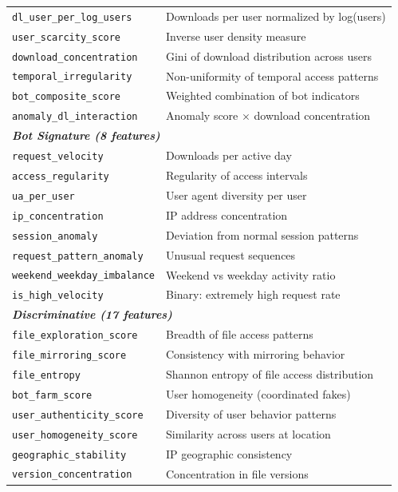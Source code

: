 \documentclass[11pt,a4paper]{article}
\begin{document}
\begin{longtable}{p{5.2cm}p{9.3cm}}
\texttt{dl\_user\_per\_log\_users} & Downloads per user normalized by log(users) \\
\texttt{user\_scarcity\_score} & Inverse user density measure \\
\texttt{download\_concentration} & Gini of download distribution across users \\
\texttt{temporal\_irregularity} & Non-uniformity of temporal access patterns \\
\texttt{bot\_composite\_score} & Weighted combination of bot indicators \\
\texttt{anomaly\_dl\_interaction} & Anomaly score $\times$ download concentration \\
\midrule
\multicolumn{2}{l}{\textit{\textbf{Bot Signature (8 features)}}} \\
\texttt{request\_velocity} & Downloads per active day \\
\texttt{access\_regularity} & Regularity of access intervals \\
\texttt{ua\_per\_user} & User agent diversity per user \\
\texttt{ip\_concentration} & IP address concentration \\
\texttt{session\_anomaly} & Deviation from normal session patterns \\
\texttt{request\_pattern\_anomaly} & Unusual request sequences \\
\texttt{weekend\_weekday\_imbalance} & Weekend vs weekday activity ratio \\
\texttt{is\_high\_velocity} & Binary: extremely high request rate \\
\midrule
\multicolumn{2}{l}{\textit{\textbf{Discriminative (17 features)}}} \\
\texttt{file\_exploration\_score} & Breadth of file access patterns \\
\texttt{file\_mirroring\_score} & Consistency with mirroring behavior \\
\texttt{file\_entropy} & Shannon entropy of file access distribution \\
\texttt{bot\_farm\_score} & User homogeneity (coordinated fakes) \\
\texttt{user\_authenticity\_score} & Diversity of user behavior patterns \\
\texttt{user\_homogeneity\_score} & Similarity across users at location \\
\texttt{geographic\_stability} & IP geographic consistency \\
\texttt{version\_concentration} & Concentration in file versions \\

\end{longtable}
\end{document}
